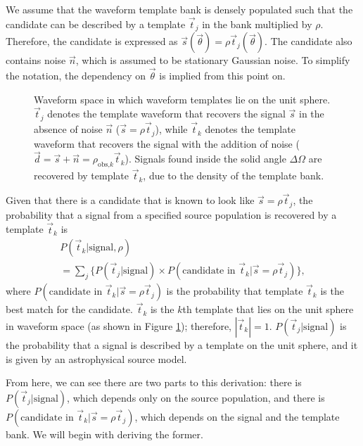 \documentclass[twocolumn,showpacs,unsortedaddress,superscriptaddress,showkeys,nofootinbib,preprintnumbers,letterpaper]{revtex4-1}
\newcommand{\rhok}{\rho_{\text{obs,$k$}}}
\begin{document}
We assume that the waveform template bank is densely populated such that the candidate can be described by a template $\vec{t}_j$ in the bank multiplied by $\rho$. Therefore, the candidate is expressed as $\vec{s}(\vec\theta)=\rho\vec{t}_j(\vec\theta)$. The candidate also contains noise $\vec{n}$, which is assumed to be stationary Gaussian noise. To simplify the notation, the dependency on $\vec{\theta}$ is implied from this point on. 

\begin{figure}

\caption{Waveform space in which waveform templates lie on the unit sphere. $\vec{t}_j$ denotes the template waveform that recovers the signal $\vec{s}$ in the absence of noise $\vec{n}$ ($\vec{s}=\rho\vec{t}_j$), while $\vec{t}_k$ denotes the template waveform that recovers the signal with the addition of noise ($\vec{d}=\vec{s}+\vec{n}=\rhok\vec{t}_k$). Signals found inside the solid angle $\Delta\Omega$ are recovered by template $\vec{t}_k$, due to the density of the template bank.}
\label{fig:unitsphere}
\end{figure}

Given that there is a candidate that is known to look like $\vec{s}=\rho\vec{t}_j$, the probability that a signal from a specified source population is recovered by a template $\vec{t}_k$ is
   \begin{multline}
   \label{eqn:prob_signal}
   P(\vec{t}_k | \text{signal},\rho)\\
   = \sum_j \Big\{ P(\vec{t}_j|\text{signal})\times P(\text{candidate in }\vec{t}_k|\vec{s}=\rho\vec{t}_j) \Big\},
   \end{multline}
where $P(\text{candidate in }\vec{t}_k|\vec{s}=\rho\vec{t}_j)$ is the probability that template $\vec{t}_k$ is the best match for the candidate. $\vec{t}_k$ is the $k$th template that lies on the unit sphere in waveform space (as shown in Figure \ref{fig:unitsphere}); therefore, $|\vec{t}_k| = 1$. $P(\vec{t}_j|\text{signal})$ is the probability that a signal is described by a template on the unit sphere, and it is given by an astrophysical source model.
	
From here, we can see there are two parts to this derivation: there is $P(\vec{t}_j|\text{signal})$, which depends only on the source population, and there is $P(\text{candidate in }\vec{t}_k|\vec{s}=\rho\vec{t}_j)$, which depends on the signal and the template bank. We will begin with deriving the former.
\end{document}

